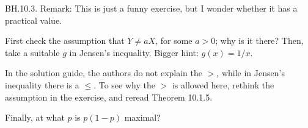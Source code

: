 
\setcounter{theorem}{2}
\begin{exercise} BH.10.3.
Remark: This is just a funny exercise, but I wonder whether it has a practical value.
\begin{hint}
First check the assumption that $Y\neq a X$, for some $a>0$; why is it there?
Then, take a suitable $g$ in Jensen's inequality.
Bigger hint: $g(x)=1/x$.

In the solution guide, the authors do not explain the $>$, while in Jensen's inequality there is a $\leq$. To see why the $>$ is allowed here, rethink the assumption in the exercise, and reread Theorem 10.1.5.

Finally, at what $p$ is $p(1-p)$ maximal?
\end{hint}
\end{exercise}

